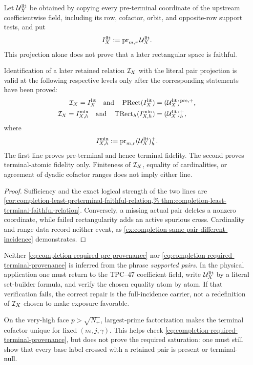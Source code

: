 Let \(\mathcal U_X^{\mathrm{lit}}\) be obtained by copying every pre-terminal
coordinate of the upstream coefficientwise field, including its row,
cofactor, orbit, and opposite-row support tests, and put
\begin{equation}
 I_X^{\mathrm{lit}}:=\operatorname{pr}_{m,r}\mathcal U_X^{\mathrm{lit}}.
 \label{eq:completion-literal-pair-projection}
\end{equation}
This projection alone does not prove that a later rectangular space is
faithful.

\begin{proposition}
\label{prop:completion-noncircular-provenance-criterion}
Identification of a later retained relation \(\mathcal I_X\) with the literal
pair projection is valid at the following respective levels only after
the corresponding statements have been proved:
\begin{align}
 \mathcal I_X=I_X^{\mathrm{lit}}
 \quad\text{and}\quad
 \operatorname{PRect}(I_X^{\mathrm{lit}})
   &=(\mathcal U_X^{\mathrm{lit}})^{\mathrm{pre},+},
 \label{eq:completion-required-pre-provenance}\\
 \mathcal I_X=I_{X,h}^{\min}
 \quad\text{and}\quad
 \operatorname{TRect}_h(I_{X,h}^{\min})
   &=(\mathcal U_X^{\mathrm{lit}})_h^+,
 \label{eq:completion-required-terminal-provenance}
\end{align}
where
\[
 I_{X,h}^{\min}:=\operatorname{pr}_{m,r}(\mathcal U_X^{\mathrm{lit}})_h^+.
\]
The first line proves pre-terminal and hence terminal fidelity.  The second
proves terminal-atomic fidelity only.  Finiteness of \(\mathcal I_X\), equality
of cardinalities, or agreement of dyadic cofactor ranges does not imply
either line.
\end{proposition}

\begin{proof}
Sufficiency and the exact logical strength of the two lines are
\cref{cor:completion-least-preterminal-faithful-relation,%
thm:completion-least-terminal-faithful-relation}.  Conversely, a missing
actual pair deletes a nonzero coordinate, while failed rectangularity adds
an active spurious cross.  Cardinality and range data record neither event,
as \cref{ex:completion-same-pair-different-incidence} demonstrates.
\end{proof}

\begin{remark}
\label{rem:completion-no-inherited-identification}
Neither \eqref{eq:completion-required-pre-provenance} nor
\eqref{eq:completion-required-terminal-provenance} is inferred from the
phrase \emph{supported pairs}.  In the physical application one must
return to the TPC--47 coefficient field, write
\(\mathcal U_X^{\mathrm{lit}}\) by a literal set-builder formula, and verify the
chosen equality atom by atom.  If that verification fails, the correct
repair is the full-incidence carrier, not a redefinition of \(\mathcal I_X\)
chosen to make exposure favorable.
\end{remark}

On the very-high face \(p>\sqrt{N_+}\), largest-prime factorization makes
the terminal cofactor unique for fixed \((m,j,\gamma)\).  This helps check
\eqref{eq:completion-required-terminal-provenance}, but does not prove the
required saturation: one must still show that every base label crossed
with a retained pair is present or terminal-null.
